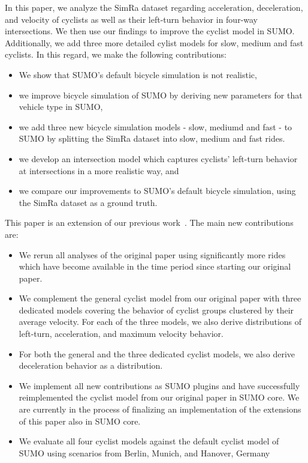 In this paper, we analyze the SimRa dataset regarding acceleration, deceleration, and velocity of cyclists as well as their left-turn behavior in four-way intersections.
We then use our findings to improve the cyclist model in SUMO.
Additionally, we add three more detailed cylist models for slow, medium and fast cyclists.
In this regard, we make the following contributions:
\begin{itemize}
    \item We show that SUMO's default bicycle simulation is not realistic,
    \item we improve bicycle simulation of SUMO by deriving new parameters for that vehicle type in SUMO,
    \item we add three new bicycle simulation models - slow, mediumd and fast - to SUMO by splitting the SimRa dataset into slow, medium and fast rides.
    \item we develop an intersection model which captures cyclists' left-turn behavior at intersections in a more realistic way, and
    \item we compare our improvements to SUMO's default bicycle simulation, using the SimRa dataset as a ground truth.
\end{itemize}

This paper is an extension of our previous work~\cite{karakaya2022realistic}.
The main new contributions are:
\begin{itemize}
\item We rerun all analyses of the original paper using significantly more rides which have become available in the time period since starting our original paper.
\item We complement the general cyclist model from our original paper with three dedicated models covering the behavior of cyclist groups clustered by their average velocity.
    For each of the three models, we also derive distributions of left-turn, acceleration, and maximum velocity behavior.
\item For both the general and the three dedicated cyclist models, we also derive deceleration behavior as a distribution.
\item We implement all new contributions as SUMO plugins and have successfully reimplemented the cyclist model from our original paper in SUMO core.
    We are currently in the process of finalizing an implementation of the extensions of this paper also in SUMO core.
\item We evaluate all four cyclist models against the default cyclist model of SUMO using scenarios from Berlin, Munich, and Hanover, Germany
\end{itemize}


